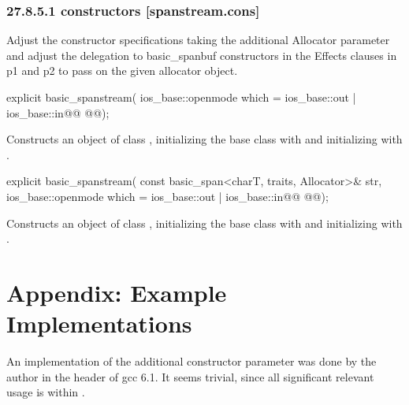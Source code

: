 \documentclass[ebook,11pt,article]{memoir}
\begin{document}
\subsection{27.8.5.1  constructors [spanstream.cons]}
Adjust the constructor specifications taking the additional Allocator parameter and adjust the delegation to basic_spanbuf constructors in the Effects clauses in p1 and p2 to pass on the given allocator object.
\begin{itemdecl}
explicit basic_spanstream(
  ios_base::openmode which = ios_base::out | ios_base::in@\ins{,}@
  @@);
\end{itemdecl}

\begin{itemdescr}
\pnum
\effects
Constructs an object of class
,
initializing the base class with
and initializing
with
.
\end{itemdescr}

%
\begin{itemdecl}
explicit basic_spanstream(
  const basic_span<charT, traits, Allocator>& str,
  ios_base::openmode which = ios_base::out | ios_base::in@\ins{,}@
  @@);
\end{itemdecl}

\begin{itemdescr}
\pnum
\effects
Constructs an object of class
,
initializing the base class with
and initializing
with
.
\end{itemdescr}



\chapter{Appendix: Example Implementations}
An implementation of the additional constructor parameter was done by the author in the  header of gcc 6.1. It seems trivial, since all significant relevant usage is within . 
\end{document}
